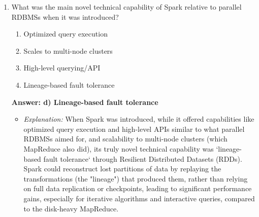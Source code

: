 \documentclass{article}
\begin{document}
\begin{enumerate}[label=\textbf{Question \arabic*.}]
\item What was the main novel technical capability of Spark relative to parallel RDBMSs when it was introduced?
    \begin{enumerate}[label=\alph*)]
        \item Optimized query execution
        \item Scales to multi-node clusters
        \item High-level querying/API
        \item Lineage-based fault tolerance
    \end{enumerate}
    \textbf{Answer: d) Lineage-based fault tolerance}
    \begin{itemize}
        \item \textit{Explanation:} When Spark was introduced, while it offered capabilities like optimized query execution and high-level APIs similar to what parallel RDBMSs aimed for, and scalability to multi-node clusters (which MapReduce also did), its truly novel technical capability was `lineage-based fault tolerance` through Resilient Distributed Datasets (RDDs). Spark could reconstruct lost partitions of data by replaying the transformations (the "lineage") that produced them, rather than relying on full data replication or checkpoints, leading to significant performance gains, especially for iterative algorithms and interactive queries, compared to the disk-heavy MapReduce.
    \end{itemize}


\end{enumerate}
\end{document}
